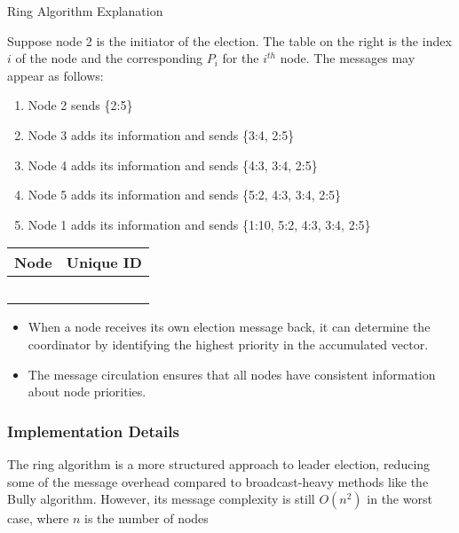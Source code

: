 \begin{example}{Ring Algorithm Explanation}
\begin{minipage}{0.65\textwidth} %
    Suppose node 2 is the initiator of the election. The table on the right is the index $i$ of the node and the corresponding $P_i$ for the $i^{th}$ node. The messages may appear as follows:
    
    \begin{enumerate}[label=\roman*), noitemsep, topsep=1.5pt]
        \item Node 2 sends \{2:5\}
        \item Node 3 adds its information and sends \{3:4, 2:5\}
        \item Node 4 adds its information and sends \{4:3, 3:4, 2:5\}
        \item Node 5 adds its information and sends \{5:2, 4:3, 3:4, 2:5\}
        \item Node 1 adds its information and sends \{1:10, 5:2, 4:3, 3:4, 2:5\}
    \end{enumerate}
\end{minipage}
\hfill %
\begin{minipage}{0.3\textwidth} %
    \centering
    \begin{tabularx}{\textwidth}{@{} >{\RaggedRight\arraybackslash}X | >{\RaggedRight\arraybackslash}X @{}}
        \toprule
        Node & Unique ID \\
        \midrule
        1 & 10 \\
        2 & 5 \\
        3 & 4 \\
        4 & 3 \\
        5 & 2 \\
        \bottomrule
    \end{tabularx}
    \label{tab:ring-algo-table}
\end{minipage}
\end{example}

\begin{itemize}[itemsep=1pt]
\item When a node receives its own election message back, it can determine the coordinator by identifying the highest priority in the accumulated vector.
\item The message circulation ensures that all nodes have consistent information about node priorities.
\end{itemize}

\subsubsection*{Implementation Details}
The ring algorithm is a more structured approach to leader election, reducing some of the message overhead compared to broadcast-heavy methods like the Bully algorithm. However, its message complexity is still $O(n^2)$ in the worst case, where $n$ is the number of nodes
